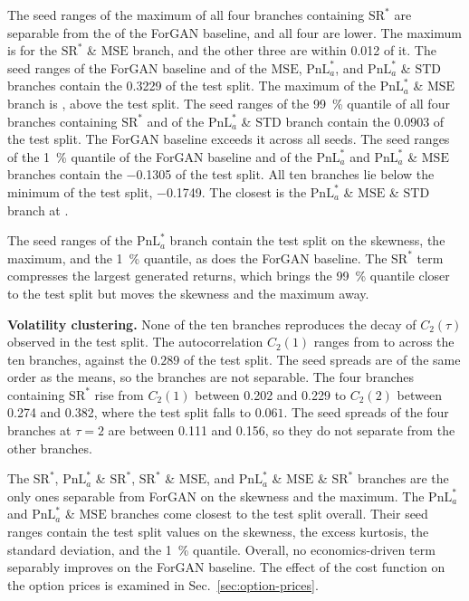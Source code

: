 The seed ranges of the maximum of all four branches containing $\mathrm{SR}^{*}$ are separable from the  of the ForGAN baseline, and all four are lower. The maximum is  for the $\mathrm{SR}^{*}$ \& $\mathrm{MSE}$
branch, and the other three are within \num{0.012} of it. The seed ranges of the ForGAN baseline and of the $\mathrm{MSE}$, $\mathrm{PnL}^{*}_{a}$, and $\mathrm{PnL}^{*}_{a}$ \& $\mathrm{STD}$ branches contain the \num{0.3229} of the test split. The maximum of the $\mathrm{PnL}^{*}_{a}$ \& $\mathrm{MSE}$ branch is , above the test split. 
The seed ranges of the \SI{99}{\percent} quantile of all four branches containing $\mathrm{SR}^{*}$ and of the $\mathrm{PnL}^{*}_{a}$ \& $\mathrm{STD}$ branch contain the \num{0.0903} of the test split. The ForGAN baseline exceeds it across all seeds.
The seed ranges of the \SI{1}{\percent} quantile of the ForGAN baseline and of the $\mathrm{PnL}^{*}_{a}$ and $\mathrm{PnL}^{*}_{a}$ \& $\mathrm{MSE}$ branches contain the \num{-0.1305} of the test split.
All ten branches lie below the minimum of the test split, \num{-0.1749}. The closest is the $\mathrm{PnL}^{*}_{a}$ \& $\mathrm{MSE}$ \& $\mathrm{STD}$ branch at .

The seed ranges of the $\mathrm{PnL}^{*}_{a}$ branch contain the test split on the skewness, the maximum, and the \SI{1}{\percent} quantile, as does the ForGAN baseline. The $\mathrm{SR}^{*}$ term compresses the largest generated returns, which brings the \SI{99}{\percent} quantile closer to the test split but moves the skewness and the maximum away.

\textbf{Volatility clustering.} None of the ten branches reproduces the decay of $C_2(\tau)$ observed in the test split. The autocorrelation $C_2(1)$ ranges from  to  across the ten branches, against the $0.289$ of the test split. The seed spreads are of the same order as the means, so the branches are not separable. The four branches containing $\mathrm{SR}^{*}$ rise from $C_2(1)$ between
\num{0.202} and \num{0.229} to $C_2(2)$ between \num{0.274} and \num{0.382}, where the test split falls to $0.061$. The seed spreads of the four branches at $\tau=2$ are between \num{0.111} and \num{0.156}, so they do not separate from the other branches.

The $\mathrm{SR}^{*}$, $\mathrm{PnL}^{*}_{a}$ \& $\mathrm{SR}^{*}$,
$\mathrm{SR}^{*}$ \& $\mathrm{MSE}$, and $\mathrm{PnL}^{*}_{a}$ \& $\mathrm{MSE}$ \& $\mathrm{SR}^{*}$ branches are the only ones separable from ForGAN on the skewness and the maximum. The $\mathrm{PnL}^{*}_{a}$ and $\mathrm{PnL}^{*}_{a}$ \& $\mathrm{MSE}$ branches come closest to the test split overall. Their seed ranges contain the test split values on the skewness, the excess kurtosis, the standard deviation, and the \SI{1}{\percent} quantile. Overall, no economics-driven term separably improves on the ForGAN baseline. The effect of the cost function on the option prices is examined in Sec.~\ref{sec:option-prices}. 